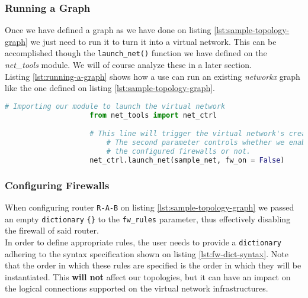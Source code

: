             \subsubsection{Running a Graph} \label{sec:graph-exec}
                Once we have defined a graph as we have done on listing \ref{lst:sample-topology-graph} we just need to run it to turn it into a virtual network. This can be accomplished though the \texttt{launch\_net()} function we have defined on the \textit{net\_tools} module. We will of course analyze these in a later section.\\

                Listing \ref{lst:running-a-graph} shows how a use can run an existing \textit{networkx} graph like the one defined on listing \ref{lst:sample-topology-graph}.\\

                \begin{lstlisting}[language = python, caption = Turning a Graph Into a Virtual Network., label = lst:running-a-graph]
                    # Importing our module to launch the virtual network
                    from net_tools import net_ctrl

                    # This line will trigger the virtual network's creation.
                        # The second parameter controls whether we enable
                        # the configured firewalls or not.
                    net_ctrl.launch_net(sample_net, fw_on = False)
                \end{lstlisting}

            \subsubsection{Configuring Firewalls} \label{sec:fw-rules}
                When configuring router \texttt{R-A-B} on listing \ref{lst:sample-topology-graph} we passed an empty \texttt{dictionary} \texttt{\{\}} to the \texttt{fw\_rules} parameter, thus effectively disabling the firewall of said router.\\

                In order to define appropriate rules, the user needs to provide a \texttt{dictionary} adhering to the syntax specification shown on listing \ref{lst:fw-dict-syntax}. Note that the order in which these rules are specified is the order in which they will be instantiated. This \textbf{will not} affect our topologies, but it can have an impact on the logical connections supported on the virtual network infrastructures.\\

